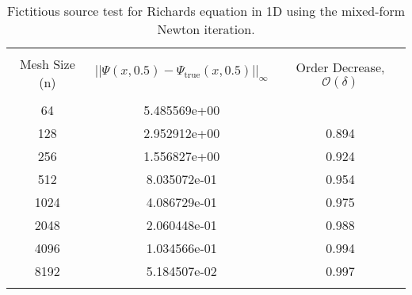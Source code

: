\begin{table}[!ht]
\centering
\caption{Fictitious source test for Richards equation in 1D using the mixed-form Newton iteration.}
\begin{tabular}{*{3}{c}}
\\[-0.5em]
\hline
\\[-0.5em]
Mesh Size (n)    &     $||\Psi(x,0.5) - \Psi_{\text{true}}(x,0.5)||_\infty$     &    Order Decrease, $\mathcal{O}(\delta)$ \\[0.5em]
\hline
\\[-0.5em]
           64    &    5.485569e+00    &                    \\
          128    &    2.952912e+00    &             0.894  \\
          256    &    1.556827e+00    &             0.924  \\
          512    &    8.035072e-01    &             0.954  \\
         1024    &    4.086729e-01    &             0.975  \\
         2048    &    2.060448e-01    &             0.988  \\
         4096    &    1.034566e-01    &             0.994  \\
         8192    &    5.184507e-02    &             0.997  \\

\\[-0.5em]
\hline
\end{tabular}
\label{table:richards-source}
\end{table}

